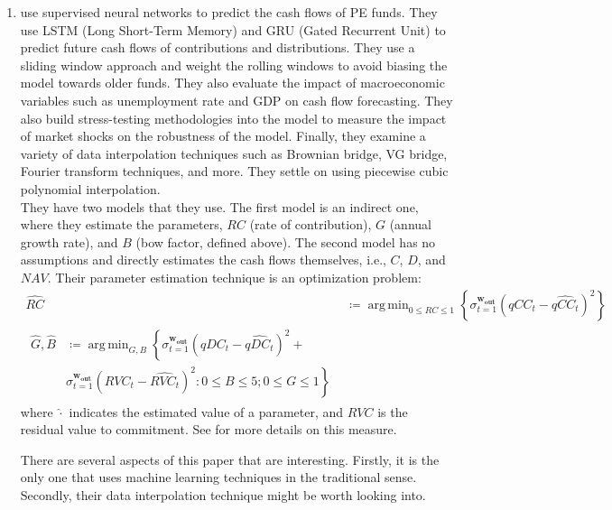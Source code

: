 \documentclass[final,5p,times,twocolumn,authoryear]{elsarticle}
\DeclareMathOperator*{\argmin}{arg\,min}
\begin{document}
\begin{enumerate}[resume, label=(\roman*)]
	\item \cite{Karatas2021} use supervised neural networks to predict the cash flows of PE funds. They use LSTM (Long Short-Term Memory) and GRU (Gated Recurrent Unit) to predict future cash flows of contributions and distributions. They use a sliding window approach and weight the rolling windows to avoid biasing the model towards older funds. They also evaluate the impact of macroeconomic variables such as unemployment rate and GDP on cash flow forecasting. They also build stress-testing methodologies into the model to measure the impact of market shocks on the robustness of the model. Finally, they examine a variety of data interpolation techniques such as Brownian bridge, VG bridge, Fourier transform techniques, and more. They settle on using piecewise cubic polynomial interpolation. \\
	
	They have two models that they use. The first model is an indirect one, where they estimate the parameters, $RC$ (rate of contribution), $G$ (annual growth rate), and $B$ (bow factor, defined above). The second model has no assumptions and directly estimates the cash flows themselves, i.e., $C$, $D$, and $NAV$. Their parameter estimation technique is an optimization problem:
	\begin{align}
		\widehat{RC} &\coloneqq \argmin_{0 \leq RC \leq 1} \left\{ \sigma_{t=1}^{\mathbf{w_{out}}} \left( qCC_t - \widehat{qCC_t} \right)^2 \right\} \\
		\begin{split}
			\widehat{G}, \widehat{B} &\coloneqq \argmin_{G, B} \left\{ \sigma_{t=1}^{\mathbf{w_{out}}} \left( qDC_t - \widehat{qDC_t} \right)^2 + \right. \\
			&\sigma_{t=1}^{\mathbf{w_{out}}} \left. \left( RVC_t - \widehat{RVC_t} \right)^2 : 0 \leq B \leq 5; 0 \leq G \leq 1 \right\}
		\end{split}
	\end{align}
	where $\widehat{\cdot}$ indicates the estimated value of a parameter, and $RVC$ is the residual value to commitment. See \cite{Takahashi2002} for more details on this measure. 
	
	There are several aspects of this paper that are interesting. Firstly, it is the only one that uses machine learning techniques in the traditional sense. Secondly, their data interpolation technique might be worth looking into.


\end{enumerate}
\end{document}
